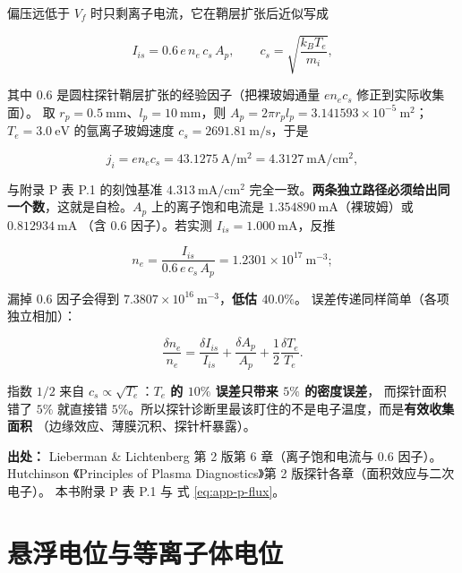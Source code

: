 偏压远低于 $V_f$ 时只剩离子电流，它在鞘层扩张后近似写成

\begin{equation}
  I_{is} = 0.6\,e\,n_e\,c_s\,A_p,
  \qquad
  c_s = \sqrt{\frac{k_BT_e}{m_i}},
  \label{eq:app-q-iis}
\end{equation}

其中 $0.6$ 是圆柱探针鞘层扩张的经验因子（把裸玻姆通量 $e n_e c_s$ 修正到实际收集面）。
取 $r_p=0.5\ \mathrm{mm}$、$l_p=10\ \mathrm{mm}$，则 $A_p=2\pi r_p l_p=3.141593\times10^{-5}\ \mathrm{m^2}$；
$T_e=3.0\ \mathrm{eV}$ 的氩离子玻姆速度 $c_s=2691.81\ \mathrm{m/s}$，于是

\begin{equation}
  j_i = e n_e c_s = 43.1275\ \mathrm{A/m^2} = 4.3127\ \mathrm{mA/cm^2},
  \label{eq:app-q-ji}
\end{equation}

与附录 P 表 P.1 的刻蚀基准 $4.313\ \mathrm{mA/cm^2}$ 完全一致。\textbf{两条独立路径必须给出同一个数}，这就是自检。$A_p$ 上的离子饱和电流是 $1.354890\ \mathrm{mA}$（裸玻姆）或 $0.812934\ \mathrm{mA}$
（含 $0.6$ 因子）。若实测 $I_{is}=1.000\ \mathrm{mA}$，反推

\begin{equation}
  n_e = \frac{I_{is}}{0.6\,e\,c_s\,A_p} = 1.2301\times10^{17}\ \mathrm{m^{-3}};
  \label{eq:app-q-ne}
\end{equation}

漏掉 $0.6$ 因子会得到 $7.3807\times10^{16}\ \mathrm{m^{-3}}$，\textbf{低估 $40.0\%$}。
误差传递同样简单（各项独立相加）：

\begin{equation}
  \frac{\delta n_e}{n_e} = \frac{\delta I_{is}}{I_{is}} + \frac{\delta A_p}{A_p} + \frac12\frac{\delta T_e}{T_e}.
  \label{eq:app-q-err}
\end{equation}

指数 $1/2$ 来自 $c_s\propto\sqrt{T_e}$：\textbf{$T_e$ 的 $10\%$ 误差只带来 $5\%$ 的密度误差}，
而探针面积错了 $5\%$ 就直接错 $5\%$。所以探针诊断里最该盯住的不是电子温度，而是\textbf{有效收集面积}
（边缘效应、薄膜沉积、探针杆暴露）。

{\footnotesize
\textbf{出处：} Lieberman \& Lichtenberg 第 2 版第 6 章（离子饱和电流与 $0.6$ 因子）。
Hutchinson
《Principles of Plasma Diagnostics》第 2 版探针各章（面积效应与二次电子）。
本书附录 P 表 P.1 与
式 \eqref{eq:app-p-flux}。
}

\section{悬浮电位与等离子体电位}
\label{sec:app-q-float}

